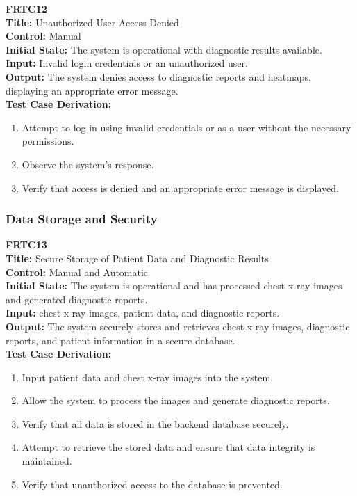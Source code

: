\documentclass[12pt, titlepage]{article}
\begin{document}
\textbf{FRTC12}\\
\textbf{Title:} Unauthorized User Access Denied\\
\textbf{Control:} Manual\\
\textbf{Initial State:} The system is operational with diagnostic results available.\\
\textbf{Input:} Invalid login credentials or an unauthorized user.\\
\textbf{Output:} The system denies access to diagnostic reports and heatmaps, displaying an appropriate error message.\\
\textbf{Test Case Derivation:}
\begin{enumerate}
  \item Attempt to log in using invalid credentials or as a user without the necessary permissions.
  \item Observe the system's response.
  \item Verify that access is denied and an appropriate error message is displayed.
\end{enumerate}
\vspace{1em}

\subsubsection{Data Storage and Security}
\textbf{FRTC13}\\
\textbf{Title:} Secure Storage of Patient Data and Diagnostic Results\\
\textbf{Control:} Manual and Automatic\\
\textbf{Initial State:} The system is operational and has processed chest x-ray images and generated diagnostic reports.\\
\textbf{Input:} chest x-ray images, patient data, and diagnostic reports.\\
\textbf{Output:} The system securely stores and retrieves chest x-ray images, diagnostic reports, and patient information in a secure database.\\
\textbf{Test Case Derivation:}
\begin{enumerate}
  \item Input patient data and chest x-ray images into the system.
  \item Allow the system to process the images and generate diagnostic reports.
  \item Verify that all data is stored in the backend database securely.
  \item Attempt to retrieve the stored data and ensure that data integrity is maintained.
  \item Verify that unauthorized access to the database is prevented.
\end{enumerate}
\vspace{1em}
\end{document}
